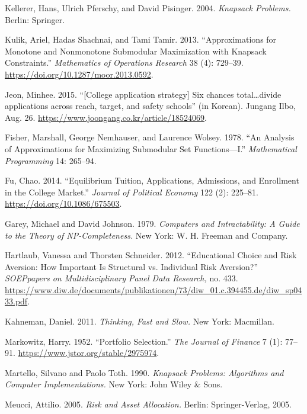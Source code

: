 \documentclass[11pt]{article} %
\theoremstyle{definition}
\theoremstyle{definition}
\begin{document}
Kellerer, Hans, Ulrich Pferschy, and David Pisinger. 2004. \emph{Knapsack Problems.} Berlin: Springer.

Kulik, Ariel, Hadas Shachnai, and Tami Tamir. 2013. ``Approximations for Monotone and Nonmonotone Submodular Maximization with Knapsack Constraints.'' \emph{Mathematics of Operations Research} 38 (4): 729--39. \url{https://doi.org/10.1287/moor.2013.0592}.

\ifen Jeon, Minhee. 2015. ``[College application strategy] Six chances total\dots divide applications across reach, target, and safety schools'' (in Korean). Jungang Ilbo, Aug. 26. \url{https://www.joongang.co.kr/article/18524069}.\fi

Fisher, Marshall, George Nemhauser, and Laurence Wolsey. 1978. ``An Analysis of Approximations for Maximizing Submodular Set Functions—I.'' \emph{Mathematical Programming} 14: 265--94. 


Fu, Chao. 2014. ``Equilibrium Tuition, Applications, Admissions, and Enrollment in the College Market.'' \emph{Journal of Political Economy} 122 (2): 225--81. \url{https://doi.org/10.1086/675503}. 

Garey, Michael and David Johnson. 1979. \emph{Computers and Intractability: A Guide to the Theory of NP-Completeness.} New York: W. H. Freeman and Company. 

Hartlaub, Vanessa and Thorsten Schneider. 2012. “Educational Choice and Risk Aversion: How Important Is Structural vs. Individual Risk Aversion?” \emph{SOEPpapers on Multidisciplinary Panel Data Research,} no. 433. \url{https://www.diw.de/documents/publikationen/73/diw_01.c.394455.de/diw_sp0433.pdf}.

Kahneman, Daniel. 2011. \emph{Thinking, Fast and Slow.} New York: Macmillan.

Markowitz, Harry. 1952. ``Portfolio Selection.'' \emph{The Journal of Finance} 7 (1): 77--91. \url{https://www.jstor.org/stable/2975974}.

Martello, Silvano and Paolo Toth. 1990. \emph{Knapsack Problems: Algorithms and Computer Implementations.} New York: John Wiley \& Sons. 

Meucci, Attilio. 2005. \emph{Risk and Asset Allocation.} Berlin: Springer-Verlag, 2005. 
\end{document}
